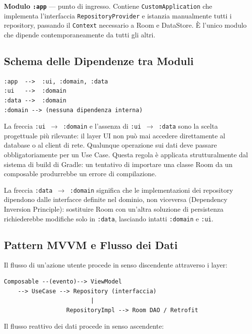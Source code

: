 \documentclass[a4paper,12pt]{report}
\begin{document}
    \textbf{Modulo \texttt{:app}} --- punto di ingresso. Contiene \texttt{CustomApplication}
    che implementa l'interfaccia \texttt{RepositoryProvider} e istanzia manualmente
    tutti i repository, passando il \texttt{Context} necessario a Room e DataStore.
    È l'unico modulo che dipende contemporaneamente da tutti gli altri.

    \subsection{Schema delle Dipendenze tra Moduli}

    \begin{verbatim}
:app  -->  :ui, :domain, :data
:ui   -->  :domain
:data -->  :domain
:domain --> (nessuna dipendenza interna)
    \end{verbatim}

    La freccia \texttt{:ui $\to$ :domain} e l'assenza di \texttt{:ui $\to$ :data}
    sono la scelta progettuale più rilevante: il layer UI non può mai accedere
    direttamente al database o al client di rete. Qualunque operazione sui dati
    deve passare obbligatoriamente per un Use Case. Questa regola è applicata
    strutturalmente dal sistema di build di Gradle: un tentativo di importare
    una classe Room da un composable produrrebbe un errore di compilazione.

    La freccia \texttt{:data $\to$ :domain} significa che le implementazioni
    dei repository dipendono dalle interfacce definite nel dominio, non viceversa
    (Dependency Inversion Principle): sostituire Room con un'altra soluzione di
    persistenza richiederebbe modifiche solo in \texttt{:data}, lasciando intatti
    \texttt{:domain} e \texttt{:ui}.

    \subsection{Pattern MVVM e Flusso dei Dati}

    Il flusso di un'azione utente procede in senso discendente attraverso i layer:

    \begin{lstlisting}[language={},basicstyle=\ttfamily\small]
Composable --(evento)--> ViewModel
    --> UseCase --> Repository (interfaccia)
                         |
                  RepositoryImpl --> Room DAO / Retrofit
    \end{lstlisting}

    Il flusso reattivo dei dati procede in senso ascendente:
\end{document}
